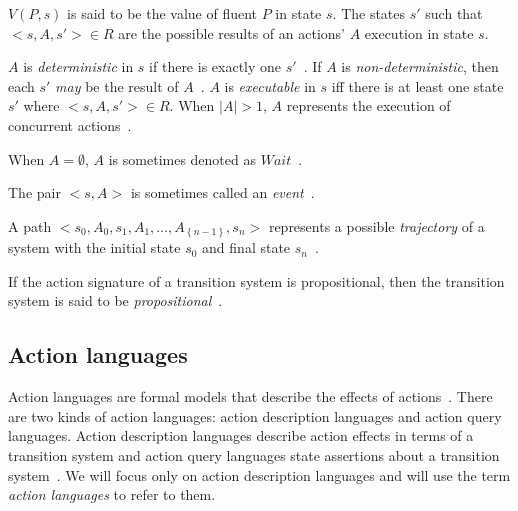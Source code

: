$ V(P,s) $ is said to be the value of fluent $ P $ in state $ s $.
The states $ s' $ such that $ <s, A, s'> \in R $ are the possible results of an actions' $ A $ execution in state $ s $.

\begin{definition}
    \label{def:action_a_determinism}
    $ A $ is \textit{deterministic} in $ s $ if there is exactly one $ s' $~\citep{gelfond_action_1998}.
    If $ A $ is \textit{non-deterministic}, then each $ s' $ \textit{may} be the result of $ A $~\citep{blount_architecture_2013}.
    $ A $ is \textit{executable} in $ s $ iff there is at least one state $ s' $ where $ <s, A, s'> \in R $.
    When $ \left|A\right|>1 $, $A$ represents the execution of concurrent actions~\citep{gelfond_action_1998, blount_architecture_2013}.
\end{definition}

\begin{definition}
    \label{def:wait}
    When $A = \emptyset$, $A$ is sometimes denoted as $Wait$~\citep{gelfond_action_1998}.
\end{definition}

\begin{definition}
    \label{def:event}
    The pair $<s, A>$ is sometimes called an \textit{event}~\citep{gelfond_authorization_2008}.
\end{definition}

\begin{definition}
    \label{def:trajectory}
    A path $ <s_0, A_0, s_1, A_1, \dots, A_{\left\{n-1\right\}}, s_n> $ represents a possible \textit{trajectory} of a system with the initial state $ s_0 $ and final state $ s_n $~\citep{blount_architecture_2013}.
\end{definition}

\begin{definition}
    \label{def:propositional_transition_system}
    If the action signature of a transition system is propositional, then the transition system is said to be \textit{propositional}~\citep{gelfond_action_1998}.
\end{definition}

\subsection{Action languages}
\label{subsec:action_languages}

Action languages are formal models that describe the effects of actions~\citep{gelfond_action_1998}.
There are two kinds of action languages: action description languages and action query languages.
Action description languages describe action effects in terms of a transition system and action query languages state assertions about a transition system~\citep{gelfond_action_1998}.
We will focus only on action description languages and will use the term \textit{action languages} to refer to them.

